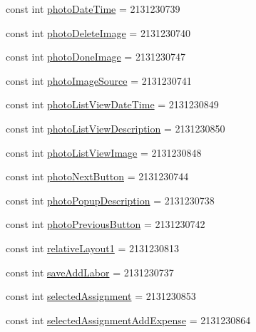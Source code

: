 \begin{DoxyCompactItemize}
\item 
const int \hyperlink{class_field_service_1_1_android_1_1_resource_1_1_id_a834d96a6a0e1d7ff462b76e57a413970}{photo\+Date\+Time} = 2131230739
\item 
const int \hyperlink{class_field_service_1_1_android_1_1_resource_1_1_id_aa9851826eb74f3ae5fee26654c9a93e3}{photo\+Delete\+Image} = 2131230740
\item 
const int \hyperlink{class_field_service_1_1_android_1_1_resource_1_1_id_a9c5f0bf7e093514ce7a6feead8367d3f}{photo\+Done\+Image} = 2131230747
\item 
const int \hyperlink{class_field_service_1_1_android_1_1_resource_1_1_id_ac8c4f65e3f58102c7466b328822c4206}{photo\+Image\+Source} = 2131230741
\item 
const int \hyperlink{class_field_service_1_1_android_1_1_resource_1_1_id_acd174a0420b873d3ab82c734a15d3eee}{photo\+List\+View\+Date\+Time} = 2131230849
\item 
const int \hyperlink{class_field_service_1_1_android_1_1_resource_1_1_id_a9f3be2562027f1c4788248b8dd62b711}{photo\+List\+View\+Description} = 2131230850
\item 
const int \hyperlink{class_field_service_1_1_android_1_1_resource_1_1_id_a7de06b8d282135bcbb5120b4a3717a32}{photo\+List\+View\+Image} = 2131230848
\item 
const int \hyperlink{class_field_service_1_1_android_1_1_resource_1_1_id_aa278aa79104f14acd3797b3bdbe13eae}{photo\+Next\+Button} = 2131230744
\item 
const int \hyperlink{class_field_service_1_1_android_1_1_resource_1_1_id_a5526f41c6fcd8ed04d44e957d7b6710a}{photo\+Popup\+Description} = 2131230738
\item 
const int \hyperlink{class_field_service_1_1_android_1_1_resource_1_1_id_af3433377fa63eec1ce1cd31947905106}{photo\+Previous\+Button} = 2131230742
\item 
const int \hyperlink{class_field_service_1_1_android_1_1_resource_1_1_id_a28c098abeb6b037caf7bffdd301d6553}{relative\+Layout1} = 2131230813
\item 
const int \hyperlink{class_field_service_1_1_android_1_1_resource_1_1_id_ad1de95f09ee86e4523eb4716bf666345}{save\+Add\+Labor} = 2131230737
\item 
const int \hyperlink{class_field_service_1_1_android_1_1_resource_1_1_id_a12bde30211819b3708f751891458e082}{selected\+Assignment} = 2131230853
\item 
const int \hyperlink{class_field_service_1_1_android_1_1_resource_1_1_id_a88c35763131188ba6b4d2f84252351bd}{selected\+Assignment\+Add\+Expense} = 2131230864

\end{DoxyCompactItemize}
